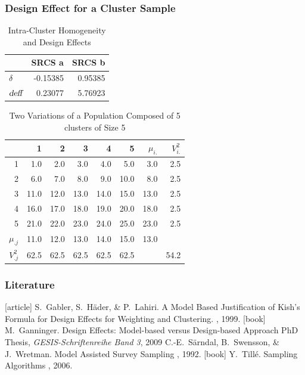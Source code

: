 \documentclass[10pt]{beamer}\usepackage[]{graphicx}\usepackage[]{color}
\newcommand{\deff}{\ensuremath{\text{\slshape deff}}}
\begin{document}
\begin{frame}[fragile]\frametitle{Design Effect for a Cluster Sample}
\begin{table}[ht]
\centering
\caption{Intra-Cluster Homogeneity and Design Effects} 
\begin{tabular}{l|rr}
  & SRCS a & SRCS b \\ 
  \hline
$\delta$ & -0.15385 & 0.95385 \\ 
  $\deff$ & 0.23077 & 5.76923 \\ 
  \end{tabular}
\end{table}
\begin{table}[ht]
\centering
\caption{Two Variations of a Population Composed of 5
clusters of Size 5} 
\begin{tabular}{r|rrrrr|r|r}
  & 1 & 2 & 3 & 4 & 5 & $\mu_{i.}$ & $V^2_{i.}$ \\ 
  \hline
1 & 1.0 & 2.0 & 3.0 & 4.0 & 5.0 & 3.0 & 2.5 \\ 
  2 & 6.0 & 7.0 & 8.0 & 9.0 & 10.0 & 8.0 & 2.5 \\ 
  3 & 11.0 & 12.0 & 13.0 & 14.0 & 15.0 & 13.0 & 2.5 \\ 
  4 & 16.0 & 17.0 & 18.0 & 19.0 & 20.0 & 18.0 & 2.5 \\ 
  5 & 21.0 & 22.0 & 23.0 & 24.0 & 25.0 & 23.0 & 2.5 \\ 
   \hline
$\mu_{.j}$ & 11.0 & 12.0 & 13.0 & 14.0 & 15.0 & 13.0 &  \\ 
   \hline
$V^2_{.j}$ & 62.5 & 62.5 & 62.5 & 62.5 & 62.5 &  & 54.2 \\ 
  \end{tabular}
\end{table}

\end{frame}

\begin{frame}[allowframebreaks]\frametitle{Literature}    
  \begin{thebibliography}{10}    
   [article]
  S.~Gabler, S.~H\"{a}der, \& P.~Lahiri.
    \newblock  A Model Based Justification of
Kish's Formula for Design Effects for Weighting and Clustering.
    , 1999.
  [book]
   M.~Ganninger.
  \newblock  Design Effects: Model-based versus Design-based Approach
  \newblock  PhD Thesis, {\em GESIS-Schriftenreihe Band 3}, 2009
    C.-E.~S\"{a}rndal, B.~Swensson, \& J.~Wretman.
    \newblock Model Assisted Survey Sampling
    , 1992.
    [book]
   Y.~Till\'{e}.
  \newblock  Sampling Algorithms
    , 2006.
  \end{thebibliography}
\end{frame} 
\end{document}
